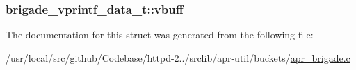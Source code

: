 \subsubsection[{\texorpdfstring{vbuff}{vbuff}}]{ brigade\+\_\+vprintf\+\_\+data\+\_\+t\+::vbuff}\hypertarget{structbrigade__vprintf__data__t_af0fe10d53f605fc1ec7ddcfd2a41b5df}{}\label{structbrigade__vprintf__data__t_af0fe10d53f605fc1ec7ddcfd2a41b5df}


The documentation for this struct was generated from the following file\+:\begin{DoxyCompactItemize}
\item 
/usr/local/src/github/\+Codebase/httpd-\/2../srclib/apr-\/util/buckets/\hyperlink{apr__brigade_8c}{apr\+\_\+brigade.\+c}\end{DoxyCompactItemize}
